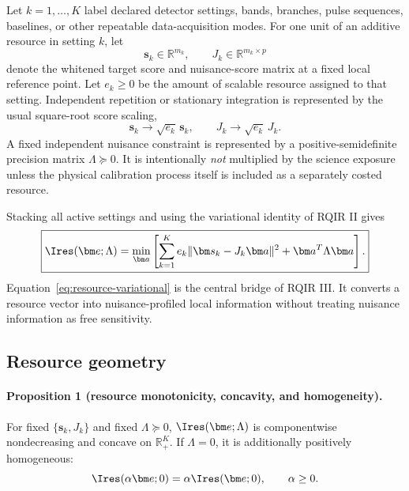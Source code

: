 Let $k=1,\ldots,K$ label declared detector settings, bands, branches, pulse sequences, baselines, or other repeatable data-acquisition modes. For one unit of an additive resource in setting $k$, let
\begin{equation}
 \bm s_k\in\mathbb R^{m_k},
 \qquad
 J_k\in\mathbb R^{m_k\times p}
\end{equation}
denote the whitened target score and nuisance-score matrix at a fixed local reference point. Let $e_k\ge0$ be the amount of scalable resource assigned to that setting. Independent repetition or stationary integration is represented by the usual square-root score scaling,
\begin{equation}
 \bm s_k\rightarrow \sqrt{e_k}\,\bm s_k,
 \qquad
 J_k\rightarrow \sqrt{e_k}\,J_k.
\end{equation}
A fixed independent nuisance constraint is represented by a positive-semidefinite precision matrix $\Lambda\succeq0$. It is intentionally \emph{not} multiplied by the science exposure unless the physical calibration process itself is included as a separately costed resource.

Stacking all active settings and using the variational identity of RQIR II gives
\begin{equation}
\boxed{
\Ires(\bm e;\Lambda)=
\min_{\bm a}
\left[
\sum_{k=1}^K e_k
 \|\bm s_k-J_k\bm a\|^2
+\bm a^T\Lambda\bm a
\right].
}
\label{eq:resource-variational}
\end{equation}
Equation~\eqref{eq:resource-variational} is the central bridge of RQIR III. It converts a resource vector into nuisance-profiled local information without treating nuisance information as free sensitivity.

\subsection{Resource geometry}

\paragraph*{Proposition 1 (resource monotonicity, concavity, and homogeneity).}
For fixed $\{\bm s_k,J_k\}$ and fixed $\Lambda\succeq0$, $\Ires(\bm e;\Lambda)$ is componentwise nondecreasing and concave on $\mathbb R_+^K$. If $\Lambda=0$, it is additionally positively homogeneous:
\begin{equation}
 \Ires(\alpha\bm e;0)=\alpha\Ires(\bm e;0),
 \qquad \alpha\ge0.
\label{eq:homogeneity}
\end{equation}

